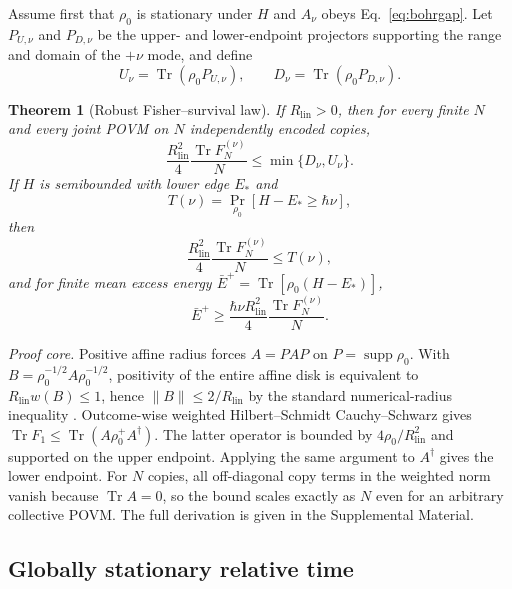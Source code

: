 \documentclass[aps,pra,preprint,nofootinbib]{revtex4-2}
\newtheorem{theorem}{Theorem}
\newcommand{\Tr}{\operatorname{Tr}}
\newcommand{\supp}{\operatorname{supp}}
\newcommand{\Rlin}{R_{\mathrm{lin}}}
\newcommand{\rhozero}{\rho_0}
\newcommand{\Fcl}{F}
\begin{document}
Assume first that $\rhozero$ is stationary under $H$ and $A_\nu$ obeys Eq.~\eqref{eq:bohrgap}. Let $P_{U,\nu}$ and $P_{D,\nu}$ be the upper- and lower-endpoint projectors supporting the range and domain of the $+\nu$ mode, and define
\begin{equation}
U_\nu=\Tr(\rhozero P_{U,\nu}),\qquad
D_\nu=\Tr(\rhozero P_{D,\nu}).
\end{equation}

\begin{theorem}[Robust Fisher--survival law]
\label{thm:single-survival}
If $\Rlin>0$, then for every finite $N$ and every joint POVM on $N$ independently encoded copies,
\begin{equation}
\boxed{
\frac{\Rlin^2}{4}\frac{\Tr \Fcl_N^{(\nu)}}{N}
\le \min\{D_\nu,U_\nu\}.
}
\label{eq:robust-survival}
\end{equation}
If $H$ is semibounded with lower edge $E_*$ and
\begin{equation}
T(\nu)=\Pr_{\rhozero}[H-E_*\ge\hbar\nu],
\end{equation}
then
\begin{equation}
\frac{\Rlin^2}{4}\frac{\Tr \Fcl_N^{(\nu)}}{N}\le T(\nu),
\label{eq:tail-survival}
\end{equation}
and for finite mean excess energy $\bar E^+=\Tr[\rhozero(H-E_*)]$,
\begin{equation}
\bar E^+\ge
\frac{\hbar\nu\Rlin^2}{4}\frac{\Tr \Fcl_N^{(\nu)}}{N}.
\label{eq:energy-corollary}
\end{equation}
\end{theorem}

\emph{Proof core.} Positive affine radius forces $A=PAP$ on $P=\supp\rhozero$. With $B=\rhozero^{-1/2}A\rhozero^{-1/2}$, positivity of the entire affine disk is equivalent to $\Rlin w(B)\le1$, hence $\|B\|\le2/\Rlin$ by the standard numerical-radius inequality \cite{BhatiaJain2023}. Outcome-wise weighted Hilbert--Schmidt Cauchy--Schwarz gives $\Tr F_1\le\Tr(A\rhozero^+A^\dagger)$. The latter operator is bounded by $4\rhozero/\Rlin^2$ and supported on the upper endpoint. Applying the same argument to $A^\dagger$ gives the lower endpoint. For $N$ copies, all off-diagonal copy terms in the weighted norm vanish because $\Tr A=0$, so the bound scales exactly as $N$ even for an arbitrary collective POVM. The full derivation is given in the Supplemental Material.

\subsection{Globally stationary relative time}
\end{document}
